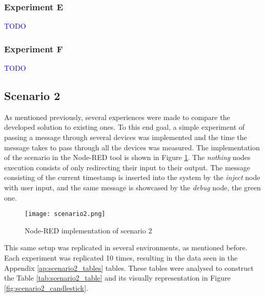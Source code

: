 \subsubsection{Experiment E}

\textcolor{blue}{TODO}


\subsubsection{Experiment F}

\textcolor{blue}{TODO}


\subsection{Scenario 2}\label{sec:discussion_scenario2}

As mentioned previously, several experiences were made to compare the developed solution to existing ones. To this end goal, a simple experiment of passing a message through several devices was implemented and the time the message takes to pass through all the devices was measured. The implementation of the scenario in the Node-RED tool is shown in Figure \ref{fig:scenario2_node_red}. The \textit{nothing} nodes execution consists of only redirecting their input to their output. The message consisting of the current timestamp is inserted into the system by the \textit{inject} node with user input, and the same message is showcased by the \textit{debug} node, the green one.

\begin{figure}[h]
\centering
\texttt{[image: scenario2.png]}
\caption[Node-RED implementation of scenario 2]{Node-RED implementation of scenario 2}\label{fig:scenario2_node_red}
\end{figure}

This same setup was replicated in several environments, as mentioned before. Each experiment was replicated 10 times, resulting in the data seen in the Appendix \ref{ap:scenario2_tables} tables. These tables were analysed to construct the Table \ref{tab:scenario2_table} and its visually representation in Figure \ref{fig:scenario2_candlestick}.

